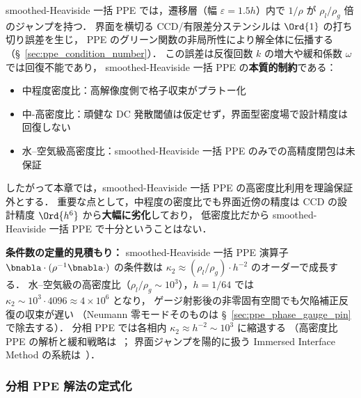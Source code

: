 smoothed-Heaviside 一括 PPE では，遷移層（幅 $\varepsilon = 1.5h$）内で
$1/\rho$ が $\rho_l/\rho_g$ 倍のジャンプを持つ．
界面を横切る CCD/有限差分ステンシルは $\Ord{1}$ の打ち切り誤差を生じ，
PPE のグリーン関数の非局所性により解全体に伝播する
（§~\ref{sec:ppe_condition_number}）．
この誤差は反復回数 $k$ の増大や緩和係数 $\omega$ では回復不能であり，
smoothed-Heaviside 一括 PPE の\textbf{本質的制約}である：
%
\begin{itemize}[noitemsep]
  \item 中程度密度比：高解像度側で格子収束がプラトー化
  \item 中-高密度比：頑健な DC 発散閾値は仮定せず，界面型密度場で設計精度は回復しない
  \item 水--空気級高密度比：smoothed-Heaviside 一括 PPE のみでの高精度閉包は未保証
\end{itemize}
%
したがって本章では，smoothed-Heaviside 一括 PPE の高密度比利用を理論保証外とする．
重要な点として，中程度の密度比でも界面近傍の精度は
CCD の設計精度 $\Ord{h^6}$ から\textbf{大幅に劣化}しており，
低密度比だから smoothed-Heaviside 一括 PPE で十分ということはない．

\noindent\textbf{条件数の定量的見積もり：}
smoothed-Heaviside 一括 PPE 演算子 $\bnabla\cdot(\rho^{-1}\bnabla\cdot)$ の条件数は
$\kappa_2 \approx (\rho_l/\rho_g)\cdot h^{-2}$ のオーダーで成長する．
水--空気級の高密度比（$\rho_l/\rho_g \sim 10^3$），$h = 1/64$ では
$\kappa_2 \sim 10^3\cdot 4096 \approx 4\times 10^{6}$ となり，
ゲージ射影後の非零固有空間でも欠陥補正反復の収束が遅い
（Neumann 零モードそのものは §~\ref{sec:ppe_phase_gauge_pin} で除去する）．
分相 PPE では各相内 $\kappa_2 \approx h^{-2}\sim 10^{3}$ に縮退する
（高密度比 PPE の解析と緩和戦略は~\cite{Guermond2006,GuermondQuartapelle1998}；
界面ジャンプを陽的に扱う Immersed Interface Method の系統は~\cite{LeVequeLi1994,Li2003IIMOverview}）．

\subsubsection{分相 PPE 解法の定式化}
\label{sec:split_ppe_formulation}

